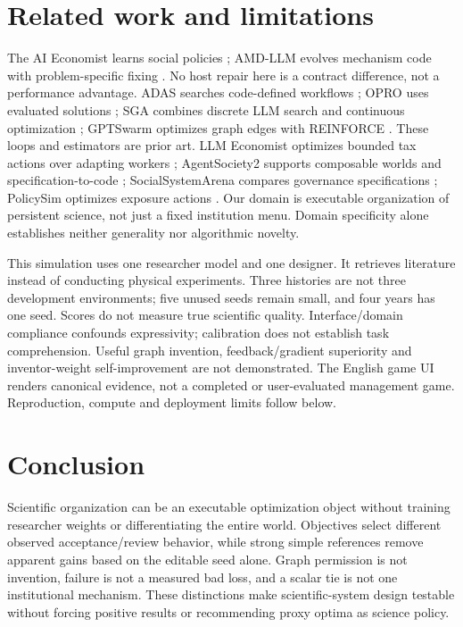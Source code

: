 \documentclass{article}
\begin{document}
\section{Related work and limitations}
The AI Economist learns social policies \citep{zheng2020economist}; AMD-LLM
evolves mechanism code with problem-specific fixing \citep{liu2025mechanism}.
No host repair here is a contract difference, not a performance advantage.
ADAS searches code-defined workflows \citep{hu2024adas}; OPRO uses evaluated
solutions \citep{yang2024opro}; SGA combines discrete LLM search and continuous
optimization \citep{ma2024sga}; GPTSwarm optimizes graph edges with REINFORCE
\citep{zhuge2024gptswarm}. These loops and estimators are prior art.
LLM Economist optimizes bounded tax actions over adapting workers
\citep{karten2025economist}; AgentSociety2 supports composable worlds and
specification-to-code \citep{piao2026agentsociety2}; SocialSystemArena compares
governance specifications \citep{fei2026institutions}; PolicySim optimizes
exposure actions \citep{huang2026policysim}. Our domain is executable organization
of persistent science, not just a fixed institution menu. Domain specificity
alone establishes neither generality nor algorithmic novelty.

This simulation uses one researcher model and one designer. It retrieves
literature instead of conducting physical experiments. Three histories are not three development
environments; five unused seeds remain small, and four years has one seed.
Scores do not measure true scientific quality. Interface/domain compliance
confounds expressivity; calibration does not establish task comprehension.
Useful graph invention, feedback/gradient superiority and inventor-weight
self-improvement are not demonstrated. The English game UI renders canonical
evidence, not a completed or user-evaluated management game. Reproduction,
compute and deployment limits follow below.

\section{Conclusion}
Scientific organization can be an executable optimization object without
training researcher weights or differentiating the entire world. Objectives
select different observed acceptance/review behavior, while strong simple
references remove apparent gains based on the editable seed alone. Graph
permission is not invention, failure is not a measured bad loss, and a scalar
tie is not one institutional mechanism. These distinctions make scientific-system
design testable without forcing positive results or recommending proxy optima
as science policy.
\end{document}
